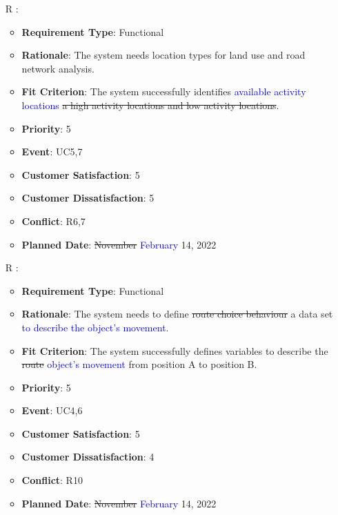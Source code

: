 \documentclass[12pt, titlepage]{article}
\newcounter{reqnum} %
\begin{document}
\begin{itemize}
\item[R\refstepcounter{reqnum}\thereqnum
\label{R_Inputs_1}:] 
\begin{itemize}
    \item \textbf{Requirement Type}: Functional
    \item \textbf{Rationale}: The system needs location types for land use and road network analysis.
    \item \textbf{Fit Criterion}: The system successfully identifies \textcolor{blue}{available activity locations} \sout{a high activity locations and low activity locations}. 
    \item \textbf{Priority}: 5
    \item \textbf{Event}: UC5,7
    \item \textbf{Customer Satisfaction}: 5
    \item \textbf{Customer Dissatisfaction}: 5
    \item \textbf{Conflict}: R6,7
    \item \textbf{Planned Date}: \sout{November} \textcolor{blue}{February} 14, 2022
\end{itemize}

\item[R\refstepcounter{reqnum}\thereqnum
\label{R_Inputs_1}:] 
\begin{itemize}
    \item \textbf{Requirement Type}: Functional
    \item \textbf{Rationale}: The system needs to define \sout{route choice behaviour} a data set \textcolor{blue}{to describe the object's movement}.
    \item \textbf{Fit Criterion}: The system successfully defines variables to describe the \sout{route} \textcolor{blue}{object's movement} from position A to position B.
    \item \textbf{Priority}: 5
    \item \textbf{Event}: UC4,6
    \item \textbf{Customer Satisfaction}: 5
    \item \textbf{Customer Dissatisfaction}: 4
    \item \textbf{Conflict}: R10
    \item \textbf{Planned Date}: \sout{November} \textcolor{blue}{February} 14, 2022
\end{itemize}



\end{itemize}
\end{document}
